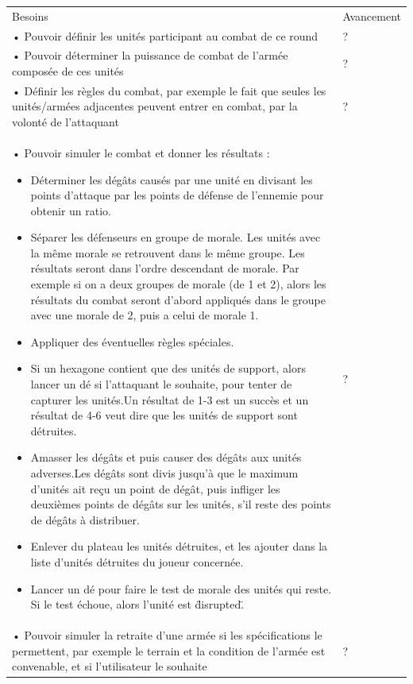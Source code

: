 \begin{center}
    \centering
    \begin{tabular}[h]{|m{14cm}|m{2cm}|} 
    \hline
    \rowcolor[HTML]{FFA8A8}
    \multicolumn{2}{|c|}{\textbf{Priorité 3/3}}\\
    \hline
    Besoins & Avancement\\
    \hline
    • Pouvoir définir les unités participant au combat de ce round & ? \\
    • Pouvoir déterminer la puissance de combat de l'armée composée de ces unités & ? \\
    • Définir les règles du combat, par exemple le fait que seules les unités/armées adjacentes peuvent entrer en combat, par la volonté de l'attaquant & ? \\
    • Pouvoir simuler le combat et donner les résultats :
    \begin{itemize}
        \item Déterminer les dégâts causés par une unité en divisant les points d'attaque par les points de défense de l'ennemie pour obtenir un ratio.
        \item Séparer les défenseurs en groupe de morale. Les unités avec la même morale se retrouvent dans le même groupe. Les résultats seront dans l'ordre descendant de morale. Par exemple si on a deux groupes de morale (de 1 et 2), alors les résultats du combat seront d'abord appliqués dans le groupe avec une morale de 2, puis a celui de morale 1.
        \item Appliquer des éventuelles règles spéciales.
        \item Si un hexagone contient que des unités de support, alors lancer un dé si l'attaquant le souhaite, pour tenter de capturer les unités.\newline Un résultat de 1-3 est un succès et un résultat de 4-6 veut dire que les unités de support sont détruites.
        \item Amasser les dégâts et puis causer des dégâts aux unités adverses.\newline Les dégâts sont divis jusqu'à que le maximum d'unités ait reçu un point de dégât, puis infliger les deuxièmes points de dégâts sur les unités, s'il reste des points de dégâts à distribuer.
        \item Enlever du plateau les unités détruites, et les ajouter dans la liste d'unités détruites du joueur concernée.
        \item Lancer un dé pour faire le test de morale des unités qui reste. Si le test échoue, alors l'unité est \"disrupted\".
    \end{itemize} & ? \\
    • Pouvoir simuler la retraite d'une armée si les spécifications le permettent, par exemple le terrain et la condition de l'armée est convenable, et si l'utilisateur le souhaite & ? \\
    \hline
    \end{tabular}
\end{center}


